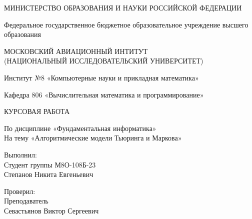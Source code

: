 \documentclass{article}
\begin{document}
\begin{center}
    \par МИНИСТЕРСТВО ОБРАЗОВАНИЯ И НАУКИ РОССИЙСКОЙ ФЕДЕРАЦИИ
\end{center}

\pagestyle{empty} %
\begin{center}
    \noindent Федеральное государственное бюджетное образовательное учреждение высшего образования
\end{center}

\begin{center}
    МОСКОВСКИЙ АВИАЦИОННЫЙ ИНТИТУТ\\
    (НАЦИОНАЛЬНЫЙ ИССЛЕДОВАТЕЛЬСКИЙ УНИВЕРСИТЕТ)
\end{center}
\vspace{-0.3cm}


\begin{center}
    \vspace{-0.1cm}
    Институт №8 «Компьютерные науки и прикладная математика»
\end{center}

\begin{center}
    \vspace{-0.1cm}
    Кафедра 806 «Вычислительная математика и программирование»
\end{center}

\begin{center}
    \vspace{1.0cm}
    КУРСОВАЯ РАБОТА
    \vspace{1.0cm}
\end{center}

\begin{center}
    По дисциплине «Фундаментальная информатика»\\
    На тему «Алгоритмические модели Тьюринга и Маркова»
\end{center}

\begin{flushright}
    \vspace{1.5cm}
    Выполнил:\\
    \vspace{0.1cm}
    Студент группы М8О-108Б-23\\
    \vspace{0.1cm}
    Степанов Никита Евгеньевич
\end{flushright}

\begin{flushright}
    \vspace{0.5cm}
    Проверил:\\
    \vspace{0.1cm}
    Преподаватель\\
    \vspace{0.1cm}
    Севастьянов Виктор Сергеевич
\end{flushright}
\end{document}
